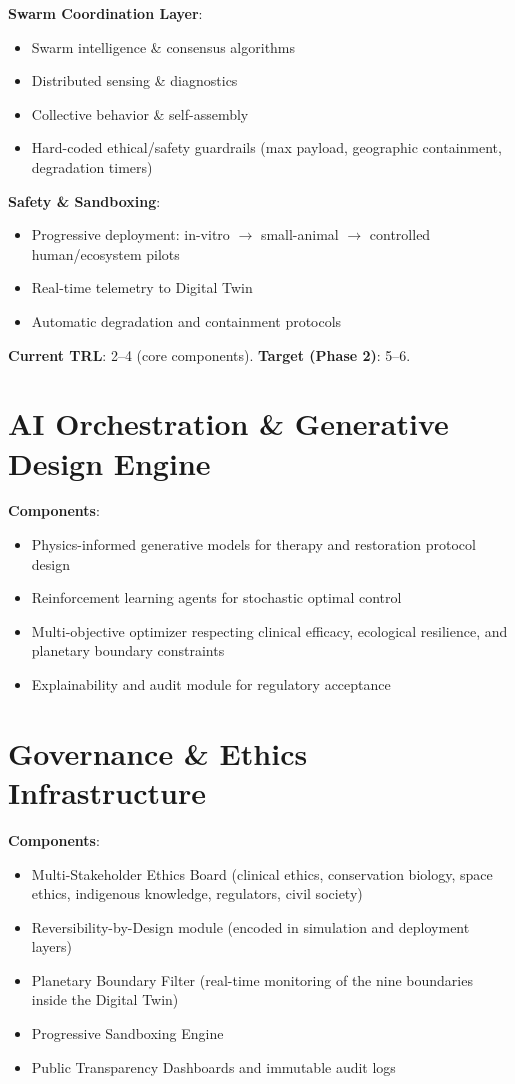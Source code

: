\documentclass[11pt,a4paper]{report}
\begin{document}
\textbf{Swarm Coordination Layer}:
\begin{itemize}
    \item Swarm intelligence \& consensus algorithms
    \item Distributed sensing \& diagnostics
    \item Collective behavior \& self-assembly
    \item Hard-coded ethical/safety guardrails (max payload, geographic containment, degradation timers)
\end{itemize}

\textbf{Safety \& Sandboxing}:
\begin{itemize}
    \item Progressive deployment: in-vitro $\to$ small-animal $\to$ controlled human/ecosystem pilots
    \item Real-time telemetry to Digital Twin
    \item Automatic degradation and containment protocols
\end{itemize}

\textbf{Current TRL}: 2--4 (core components). \textbf{Target (Phase 2)}: 5--6.

\section{AI Orchestration \& Generative Design Engine}

\textbf{Components}:
\begin{itemize}
    \item Physics-informed generative models for therapy and restoration protocol design
    \item Reinforcement learning agents for stochastic optimal control
    \item Multi-objective optimizer respecting clinical efficacy, ecological resilience, and planetary boundary constraints
    \item Explainability and audit module for regulatory acceptance
\end{itemize}

\section{Governance \& Ethics Infrastructure}

\textbf{Components}:
\begin{itemize}
    \item Multi-Stakeholder Ethics Board (clinical ethics, conservation biology, space ethics, indigenous knowledge, regulators, civil society)
    \item Reversibility-by-Design module (encoded in simulation and deployment layers)
    \item Planetary Boundary Filter (real-time monitoring of the nine boundaries inside the Digital Twin)
    \item Progressive Sandboxing Engine
    \item Public Transparency Dashboards and immutable audit logs
\end{itemize}
\end{document}
